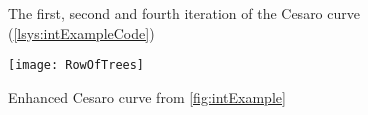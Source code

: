 \begin{figure}[h]
	 \hfill
	 \hfill
	\caption[The first, second and fourth iteration of the Cesaro curve]{The first, second and fourth iteration of the Cesaro curve (\autoref{lsys:intExampleCode})}
	\label{fig:intExample}
\end{figure}

\begin{figure}[h]
	\texttt{[image: RowOfTrees]}
	\caption[Enhanced Cesaro curve]{Enhanced Cesaro curve from \autoref{fig:intExample} \cite[p.~48]{PL91}}
	\label{fig:rowOfTrees}
\end{figure}


































